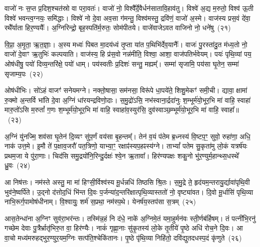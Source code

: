 वाजो॑ नः स॒प्त प्र॒दिश॒श्चत॑स्रो वा परा॒वतः॑। वाजो॑ नो॒ विश्वै᳚र्दे॒वैर्धन॑सातावि॒हाव॑तु। विश्वे॑ अ॒द्य म॒रुतो॒ विश्व॑ ऊ॒ती विश्वे॑ भवन्त्व॒ग्नयः॒ समि॑द्धाः। विश्वे॑ नो दे॒वा अव॒सा ग॑मन्तु॒ विश्व॑मस्तु॒ द्रवि॑णं॒ वाजो॑ अ॒स्मे। वाज॑स्य प्रस॒वं दे॑वा॒ रथै᳚र्याता हिर॒ण्ययैः᳚। अ॒ग्निरिन्द्रो॒ बृह॒स्पति॑र्म॒रुतः॒ सोम॑पीतये। वाजे॑वाजे\-ऽवत वाजिनो नो॒ धने॑षु~(२१)

वि॒प्रा॒ अ॒मृ॒ता॒ ऋ॒त॒ज्ञाः॒। अ॒स्य मध्वः॑ पिबत मा॒दय॑ध्वं तृ॒प्ता या॑त प॒थिभि॑र्देव॒यानैः᳚। वाजः॑ पु॒रस्ता॑दु॒त म॑ध्य॒तो नो॒ वाजो॑ दे॒वाꣳ ऋ॒तुभिः॑ कल्पयाति। वाज॑स्य॒ हि प्र॑स॒वो नन्न॑मीति॒ विश्वा॒ आशा॒ वाज॑पतिर्भवेयम्। पयः॑ पृथि॒व्यां पय॒ ओष॑धीषु॒ पयो॑ दिव्य॒न्तरि॑क्षे॒ पयो॑ धाम्। पय॑स्वतीः प्र॒दिशः॑ सन्तु॒ मह्यम्᳚। सम्मा॑ सृजामि॒ पय॑सा घृ॒तेन॒ सम्मा॑ सृजाम्य॒पः~(२२)

ओष॑धीभिः। सो॑\-ऽहं वाजꣳ॑ सनेयमग्ने। नक्तो॒षासा॒ सम॑नसा॒ विरू॑पे धा॒पये॑ते॒ शिशु॒मेकꣳ॑ समी॒ची। द्यावा॒ क्षामा॑ रु॒क्मो अ॒न्तर्वि भा॑ति दे॒वा अ॒ग्निं धा॑रयन्द्रविणो॒दाः। स॒मु॒द्रो॑\-ऽसि॒ नभ॑स्वाना॒र्द्रदा॑नुः श॒म्भूर्म॑यो॒भूर॒भि मा॑ वाहि॒ स्वाहा॑ मारु॒तो॑\-ऽसि म॒रुतां᳚ ग॒णः श॒म्भूर्म॑यो॒भूर॒भि मा॑ वाहि॒ स्वाहा॑व॒स्युर॑सि॒ दुव॑स्वाञ्छ॒म्भूर्म॑यो॒भूर॒भि मा॑ वाहि॒ स्वाहा᳚॥~(२३)

{\anuvakamend[{धने᳚ष्व॒पो दुव॑स्वाञ्छ॒म्भूर्म॑यो॒भूर॒भि मा॒ द्वे च॑}]}%

अ॒ग्निं यु॑नज्मि॒ शव॑सा घृ॒तेन॑ दि॒व्यꣳ सु॑प॒र्णं वय॑सा बृ॒हन्तम्᳚। तेन॑ व॒यं प॑तेम ब्र॒ध्नस्य॑ वि॒ष्टप॒ꣳ॒ सुवो॒ रुहा॑णा॒ अधि॒ नाक॑ उत्त॒मे। इ॒मौ ते॑ प॒क्षाव॒जरौ॑ पत॒त्रिणो॒ याभ्या॒ꣳ॒ रक्षाꣴ॑स्यप॒हꣴस्य॑ग्ने। ता\-भ्यां᳚ पतेम सु॒कृता॑मु लो॒कं यत्रर्\mbox{}ष॑यः प्रथम॒जा ये पु॑रा॒णाः। चिद॑सि समु॒द्रयो॑नि॒रिन्दु॒र्दक्षः॑ श्ये॒न ऋ॒तावा᳚। हिर॑ण्यपक्षः शकु॒नो भु॑र॒ण्युर्म॒हान्थ्स॒धस्थे᳚ ध्रु॒वः~(२४)

आ निष॑त्तः। नम॑स्ते अस्तु॒ मा मा॑ हिꣳसी॒र्विश्व॑स्य मू॒र्धन्नधि॑ तिष्ठसि श्रि॒तः। स॒मु॒द्रे ते॒ हृद॑यम॒न्तरायु॒र्द्यावा॑\-पृथि॒वी भुव॑ने॒ष्वर्पि॑ते। उ॒द्नो द॑त्तोद॒धिं भि॑न्त दि॒वः प॒र्जन्या॑द॒न्तरि॑क्षात्पृथि॒व्यास्ततो॑ नो॒ वृष्ट्या॑वत। दि॒वो मू॒र्धासि॑ पृथि॒व्या नाभि॒रूर्ग॒पामोष॑धीनाम्। वि॒श्वायुः॒ शर्म॑ स॒प्रथा॒ नम॑स्प॒थे। येनर्\mbox{}ष॑य॒स्तप॑सा स॒त्रम्~(२५)

आस॒तेन्धा॑ना अ॒ग्निꣳ सुव॑रा॒भर॑न्तः। तस्मि॑न्न॒हं नि द॑धे॒ नाके॑ अ॒ग्निमे॒तं यमा॒हुर्मन॑वः स्ती॒र्णब॑र्\mbox{}हिषम्। तं पत्नी॑भि॒रनु॑ गच्छेम देवाः पु॒त्रैर्भ्रातृ॑भिरु॒त वा॒ हिर॑ण्यैः। नाकं॑ गृह्णा॒नाः सु॑कृ॒तस्य॑ लो॒के तृ॒तीये॑ पृ॒ष्ठे अधि॑ रोच॒ने दि॒वः। आ वा॒चो मध्य॑मरुहद्भुर॒ण्युर॒यम॒ग्निः सत्प॑ति॒श्चेकि॑तानः। पृ॒ष्ठे पृ॑थि॒व्या निहि॑तो॒ दवि॑द्युतदधस्प॒दं कृ॑णुते~(२६)

